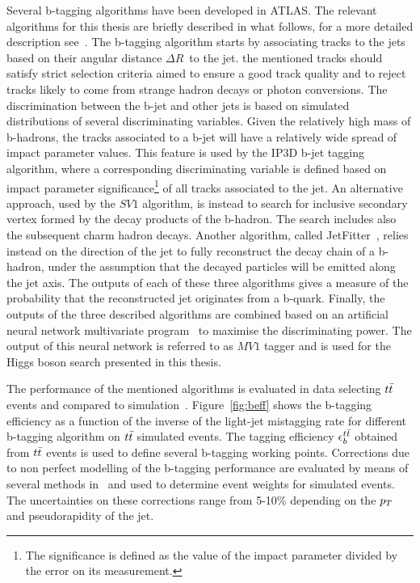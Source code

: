Several b-tagging algorithms have been developed in ATLAS. The relevant algorithms for
this thesis are briefly described in what follows, for a more detailed description see~\cite{AtlasCSCBook}.
The b-tagging algorithm starts by  associating tracks to the jets based on their angular distance $\Delta R\,$ to the jet. the mentioned 
tracks should satisfy strict selection criteria aimed to ensure a good track quality 
and to reject tracks likely to come from strange hadron decays or photon conversions. 
The discrimination between the b-jet and other jets is based on simulated distributions of several 
 discriminating variables. Given the relatively high mass of b-hadrons, the tracks associated to a 
 b-jet will have a relatively wide spread of impact parameter values. This feature is used by the IP3D b-jet tagging 
algorithm, where a corresponding discriminating variable is defined based on impact parameter significance\footnote{
The significance is defined as the value of the impact parameter divided by the error on its measurement.}
 of all tracks associated to the jet. An alternative approach, used by the $SV1$ algorithm, is instead  to search for inclusive 
secondary vertex formed by the decay products of the b-hadron.  The search includes also 
the subsequent charm hadron decays. Another algorithm, called JetFitter~\cite{jetfitter}, relies instead on the direction of the jet
to fully reconstruct the decay chain of a b-hadron, under the assumption  that the decayed particles will be emitted along the
jet axis. The outputs of each of these three algorithms gives a measure of the probability that the reconstructed jet originates from a b-quark.
Finally, the outputs of the three described algorithms  are combined based on an
artificial neural network multivariate program~\cite{TMVA} to maximise the discriminating power. The output of this neural 
network is referred to as $MV1$ tagger and is used for the Higgs boson search presented in this thesis. 


The performance of the mentioned algorithms is evaluated in data selecting $t\bar{t}$ events and compared to simulation~\cite{btagPerf}.
Figure~\ref{fig:beff} shows the b-tagging efficiency as a function of the inverse of the light-jet mistagging rate
for different b-tagging algorithm on $t\bar{t}$ simulated events. The tagging efficiency $\epsilon_b^{t\bar{t}}$ obtained from $t\bar{t}$ events
is used to define several b-tagging working points. Corrections due to non perfect modelling
of the b-tagging performance are evaluated by means of several methods
in~\cite{BtaggingScaleFactors, BtaggingScaleFactorsNew} and used to determine event weights for simulated events.
The uncertainties on these corrections  range from 5-10\%  depending on the $p_{T}$ and pseudorapidity of the jet.


